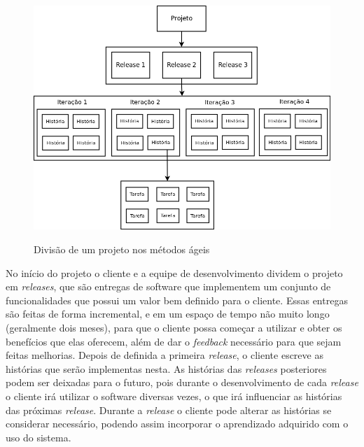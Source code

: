 \begin{figure}[h]
  \center
  \caption{Divisão de um projeto nos métodos ágeis}
  \includegraphics[scale=0.45]{images/projeto}
  \label{img:projeto_agile}
\end{figure}

No início do projeto o cliente e a equipe de desenvolvimento dividem o projeto em \textit{releases}, que são entregas de software que implementem um conjunto de funcionalidades que possui um valor bem definido para o cliente. Essas entregas são feitas de forma incremental, e em um espaço de tempo não muito longo (geralmente dois meses), para que o cliente possa começar a utilizar e obter os benefícios que elas oferecem, além de dar o \textit{feedback} necessário para que sejam feitas melhorias. Depois de definida a primeira \textit{release}, o cliente escreve as histórias que serão implementas nesta. As histórias das \textit{releases} posteriores podem ser deixadas para o futuro, pois durante o desenvolvimento de cada \textit{release} o cliente irá utilizar o software diversas vezes, o que irá influenciar as histórias das próximas \textit{release}. Durante a \textit{release} o cliente pode alterar as histórias se considerar necessário, podendo assim incorporar o aprendizado adquirido com o uso do sistema.

